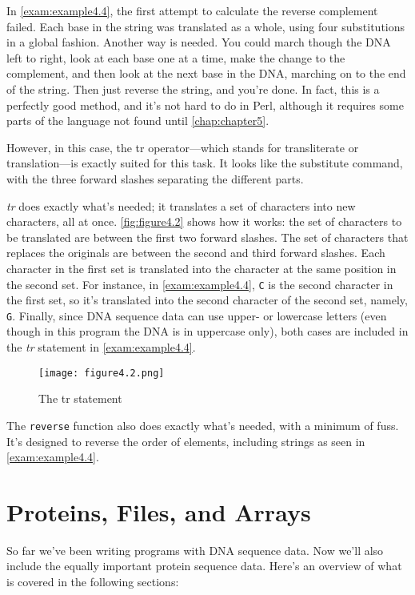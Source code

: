 In \autoref{exam:example4.4}, the first attempt to calculate the reverse complement failed. Each base in the string was translated as a whole, using four substitutions in a global fashion. Another way is needed. You could march though the DNA left to right, look at each base one at a time, make the change to the complement, and then look at the next base in the DNA, marching on to the end of the string. Then just reverse the string, and you're done. In fact, this is a perfectly good method, and it's not hard to do in Perl, although it requires some parts of the language not found until \autoref{chap:chapter5}.

However, in this case, the tr operator—which stands for transliterate or translation—is exactly suited for this task. It looks like the substitute command, with the three forward slashes separating the different parts.

\textit{tr} does exactly what's needed; it translates a set of characters into new characters, all at once. \autoref{fig:figure4.2} shows how it works: the set of characters to be translated are between the first two forward slashes. The set of characters that replaces the originals are between the second and third forward slashes. Each character in the first set is translated into the character at the same position in the second set. For instance, in \autoref{exam:example4.4}, \verb|C| is the second character in the first set, so it's translated into the second character of the second set, namely, \verb|G|.  Finally, since DNA sequence data can use upper- or lowercase letters (even though in this program the DNA is in uppercase only), both cases are included in the \textit{tr} statement in \autoref{exam:example4.4}.

\begin{figure}
  \centering
  \texttt{[image: figure4.2.png]}
  \caption{The tr statement}
  \label{fig:figure4.2}
\end{figure}

The \verb|reverse| function also does exactly what's needed, with a minimum of fuss. It's designed to reverse the order of elements, including strings as seen in \autoref{exam:example4.4}.

\section{Proteins, Files, and Arrays}
So far we've been writing programs with DNA sequence data. Now we'll also include the equally important protein sequence data. Here's an overview of what is covered in the following sections:

